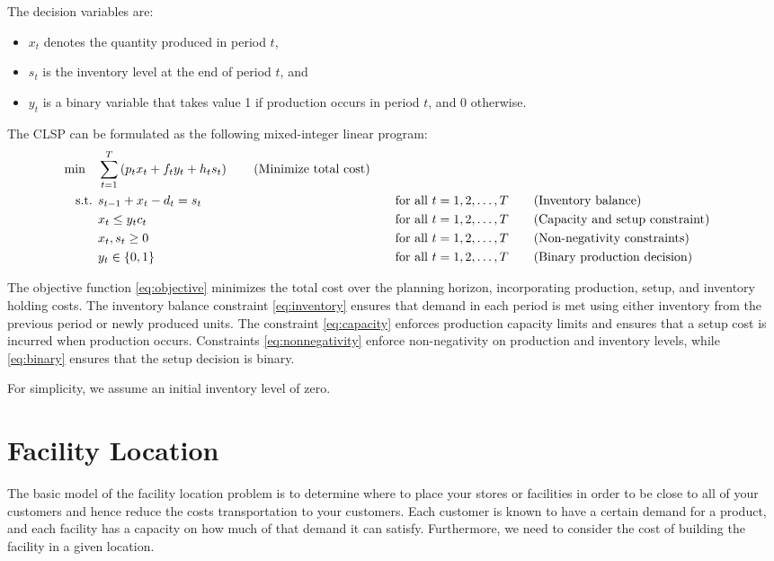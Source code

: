 The decision variables are:
\begin{itemize}
    \item \( x_t \) denotes the quantity produced in period \( t \),
    \item \( s_t \) is the inventory level at the end of period \( t \), and
    \item \( y_t \) is a binary variable that takes value 1 if production occurs in period \( t \), and 0 otherwise.
\end{itemize}

The CLSP can be formulated as the following mixed-integer linear program:
\begin{align}
\min \quad & \sum_{t=1}^{T} \left( p_t x_t + f_t y_t + h_t s_t \right)   \tag{Minimize total cost}\label{eq:objective} \\
\mbox{ s.t. }        & s_{t-1} + x_t - d_t = s_t &&\quad \mbox{for all } t = 1,2,\dots,T   \tag{Inventory balance}\label{eq:inventory} \\
    & x_t \leq y_t c_t &&\quad \mbox{for all } t = 1,2,\dots,T   \tag{Capacity and setup constraint}\label{eq:capacity} \\
    & x_t, s_t \geq 0 &&\quad \mbox{for all } t = 1,2,\dots,T   \tag{Non-negativity constraints}\label{eq:nonnegativity} \\
    & y_t \in \{0,1\} &&\quad \mbox{for all } t = 1,2,\dots,T   \tag{Binary production decision}\label{eq:binary}
\end{align}

The objective function \eqref{eq:objective} minimizes the total cost over the planning horizon, incorporating production, setup, and inventory holding costs. The inventory balance constraint \eqref{eq:inventory} ensures that demand in each period is met using either inventory from the previous period or newly produced units. The constraint \eqref{eq:capacity} enforces production capacity limits and ensures that a setup cost is incurred when production occurs. Constraints \eqref{eq:nonnegativity} enforce non-negativity on production and inventory levels, while \eqref{eq:binary} ensures that the setup decision is binary.

For simplicity, we assume an initial inventory level of zero.

\section{Facility Location}

The basic model of the facility location problem is to determine where to place your stores or facilities in order to be close to all of your customers and hence reduce the costs transportation to your customers.  Each customer is known to have a certain demand for a product, and each facility has a capacity on how much of that demand it can satisfy.  Furthermore, we need to consider the cost of building the facility in a given location.

